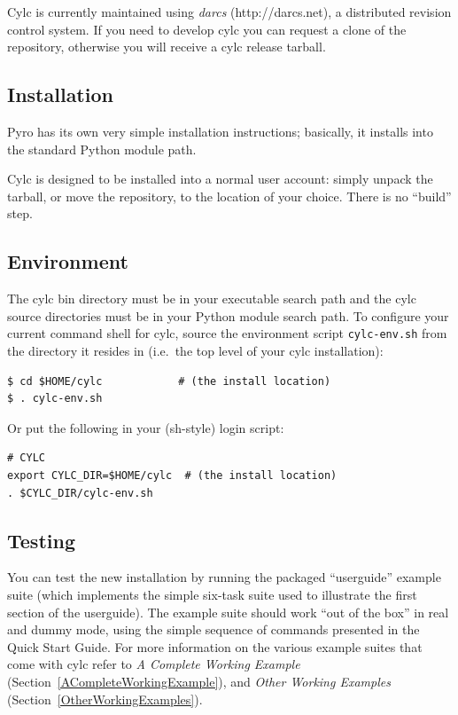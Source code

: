 \documentclass[11pt,a4paper]{article}
\begin{document}
Cylc is currently maintained using {\em darcs} (http://darcs.net), a
distributed revision control system. If you need to develop cylc you can
request a clone of the repository, otherwise you will receive a cylc
release tarball. 

\subsection{Installation} 
\label{Installation}

Pyro has its own very simple installation instructions; basically, it
installs into the standard Python module path.

Cylc is designed to be installed into a normal user account: simply
unpack the tarball, or move the repository, to the location of your
choice. There is no ``build'' step.

\subsection{Environment} 
\label{Environment}

\lstset{language=bash} 

The cylc bin directory must be in your executable search path and the
cylc source directories must be in your Python module search path. To
configure your current command shell for cylc, source the environment
script \lstinline=cylc-env.sh= from the directory it resides in (i.e.\
the top level of your cylc installation):

\begin{lstlisting}
$ cd $HOME/cylc            # (the install location)
$ . cylc-env.sh
\end{lstlisting}

Or put the following in your (sh-style) login script:

\begin{lstlisting}
# CYLC
export CYLC_DIR=$HOME/cylc  # (the install location)
. $CYLC_DIR/cylc-env.sh
\end{lstlisting}

\subsection{Testing} 
\label{Testing}

You can test the new installation by running the packaged ``userguide''
example suite (which implements the simple six-task suite used to 
illustrate the first section of the userguide). The example suite
should work ``out of the box'' in real and dummy mode, using the simple
sequence of commands presented in the Quick Start Guide. 
For more information on the various example suites that come with cylc
refer to {\em A Complete Working Example}
(Section~\ref{ACompleteWorkingExample}), and {\em Other Working
Examples} (Section~\ref{OtherWorkingExamples}).  
\end{document}
